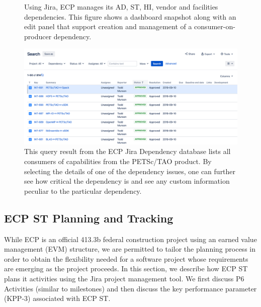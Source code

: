 \begin{figure}
	\centering
	\caption{Using Jira, ECP manages its AD, ST, HI, vendor and facilities dependencies.  This figure shows a dashboard snapshot along with an edit panel that support creation and management of a consumer-on-producer dependency.}
	\label{fig:dependency-dashboard-edit}
\end{figure}

\begin{figure}
	\centering
	\includegraphics[width=0.9\linewidth]{PETSc-TAO-Dependencies}
	\caption{This query result from the ECP Jira Dependency database lists all consumers of capabilities from the PETSc/TAO product.  By selecting the details of one of the dependency issues, one can further see how critical the dependency is and see any custom information peculiar to the particular dependency.}
	\label{fig:petsc-tao-dependencies}
\end{figure}

\newpage
\subsection{ECP ST Planning and Tracking}

While ECP is an official 413.3b federal construction project using an earned value management (EVM) structure, we are permitted to tailor the planning process in order to obtain the flexibility needed for a software project whose requirements are emerging as the project proceeds.  In this section, we describe how ECP ST plans it activities using the Jira project management tool.  We first discuss P6 Activities (similar to milestones) and then discuss the key performance parameter (KPP-3) associated with ECP ST.


